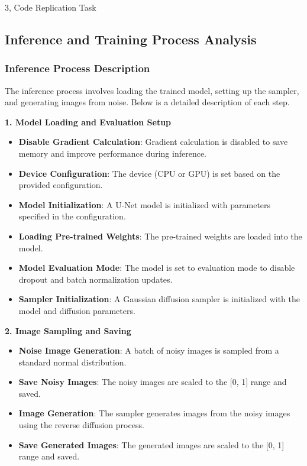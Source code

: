 \documentclass[10pt,a4paper]{article}
\begin{document}
\begin{task}{3, Code Replication Task}
\subsection{Inference and Training Process Analysis}

\subsubsection{Inference Process Description}

The inference process involves loading the trained model, setting up the sampler, and generating images from noise. Below is a detailed description of each step.

\textbf{1. Model Loading and Evaluation Setup}

\begin{itemize}
    \item \textbf{Disable Gradient Calculation}: Gradient calculation is disabled to save memory and improve performance during inference.
    \item \textbf{Device Configuration}: The device (CPU or GPU) is set based on the provided configuration.
    \item \textbf{Model Initialization}: A U-Net model is initialized with parameters specified in the configuration.
    \item \textbf{Loading Pre-trained Weights}: The pre-trained weights are loaded into the model.
    \item \textbf{Model Evaluation Mode}: The model is set to evaluation mode to disable dropout and batch normalization updates.
    \item \textbf{Sampler Initialization}: A Gaussian diffusion sampler is initialized with the model and diffusion parameters.
\end{itemize}

\textbf{2. Image Sampling and Saving}

\begin{itemize}
    \item \textbf{Noise Image Generation}: A batch of noisy images is sampled from a standard normal distribution.
    \item \textbf{Save Noisy Images}: The noisy images are scaled to the [0, 1] range and saved.
    \item \textbf{Image Generation}: The sampler generates images from the noisy images using the reverse diffusion process.
    \item \textbf{Save Generated Images}: The generated images are scaled to the [0, 1] range and saved.
\end{itemize}


\end{task}
\end{document}
